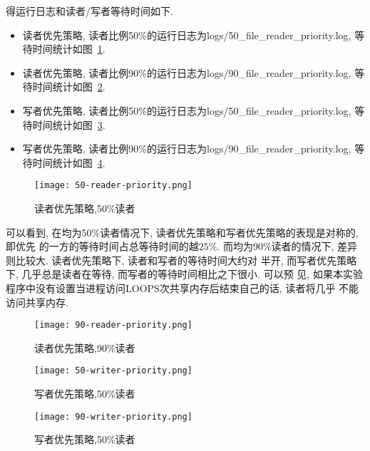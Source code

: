 得运行日志和读者/写者等待时间如下.
\begin{itemize}
    \item 读者优先策略, 读者比例50\%的运行日志为logs/50\_file\_reader\_priority.log,
          等待时间统计如图~\ref{fig:读者优先策略50}.
    \item 读者优先策略, 读者比例90\%的运行日志为logs/90\_file\_reader\_priority.log,
          等待时间统计如图~\ref{fig:读者优先策略90}.
    \item 写者优先策略, 读者比例50\%的运行日志为logs/50\_file\_reader\_priority.log,
          等待时间统计如图~\ref{fig:写者优先策略50}.
    \item 写者优先策略, 读者比例90\%的运行日志为logs/90\_file\_reader\_priority.log,
          等待时间统计如图~\ref{fig:写者优先策略90}.
\end{itemize}

\begin{figure}[ht!]
    \centering
    \texttt{[image: 50-reader-priority.png]}
    \caption{读者优先策略,50\%读者}
    \label{fig:读者优先策略50}
\end{figure}
可以看到, 在均为50\%读者情况下, 读者优先策略和写者优先策略的表现是对称的, 即优先
的一方的等待时间占总等待时间的越$25\%$.
而均为90\%读者的情况下, 差异则比较大. 读者优先策略下, 读者和写者的等待时间大约对
半开, 而写者优先策略下, 几乎总是读者在等待, 而写者的等待时间相比之下很小. 可以预
见, 如果本实验程序中没有设置当进程访问LOOPS次共享内存后结束自己的话, 读者将几乎
不能访问共享内存.

\begin{figure}[ht!]
    \centering
    \texttt{[image: 90-reader-priority.png]}
    \caption{读者优先策略,90\%读者}
    \label{fig:读者优先策略90}
\end{figure}

\begin{figure}[ht!]
    \centering
    \texttt{[image: 50-writer-priority.png]}
    \caption{写者优先策略,50\%读者}
    \label{fig:写者优先策略50}
\end{figure}

\begin{figure}[ht!]
    \centering
    \texttt{[image: 90-writer-priority.png]}
    \caption{写者优先策略,50\%读者}
    \label{fig:写者优先策略90}
\end{figure}
